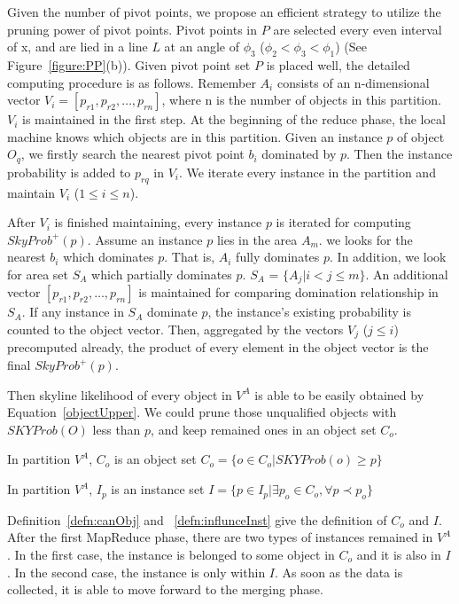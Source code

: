 Given the number of pivot points, we propose an efficient strategy to utilize the pruning power of pivot points. Pivot points in $P$ are selected every even interval of x, and are lied in a line $L$ at an angle of $\phi_3$ ($ \phi_2 < \phi_3 < \phi_1 $) (See Figure~\ref{figure:PP}(b)).
Given pivot point set $P$ is placed well, the detailed computing procedure is as follows. Remember $A_i$ consists of an n-dimensional vector $V_i = [p_{r1},p_{r2},\dots,p_{rn}]$, where n is the number of objects in this partition. $V_i$ is maintained in the first step. At the beginning of the reduce phase, the local machine knows which objects are in this partition. Given an instance $p$ of object $O_q$, we firstly search the nearest pivot point $b_i$ dominated by $p$. Then the instance probability is added to $p_{rq}$ in $V_i$. We iterate every instance in the partition and maintain $V_i$ ($ 1 \leq i \leq n$). 

After $V_i$ is finished maintaining, every instance $p$ is iterated for computing $SkyProb^+(p)$. Assume an instance $p$ lies in the area $A_m$. we looks for the nearest $b_i$ which dominates $p$. That is, $A_i$ fully dominates $p$. In addition, we look for area set $S_A$ which partially dominates $p$. $S_A$ = $\{A_j| i < j \leq m \}$.
An additional vector $[p_{r1},p_{r2},\dots,p_{rn}]$ is maintained for comparing domination relationship in $S_A$. If any instance in $S_A$ dominate $p$, the instance's existing probability is counted to the object vector. Then, aggregated by the vectors $V_j$ ($j \leq i$) precomputed already, the product of every element in the object vector is the final $SkyProb^+(p)$.

Then skyline likelihood of every object in $V^A$ is able to be easily obtained by Equation~\ref{objectUpper}. We could prune those unqualified objects with $SKYProb(O)$ less than $p$, and keep remained ones in an object set $C_o$.

\begin{defn}
\label{defn:canObj}
In partition $V^A$, $C_o$ is an object set $C_o = \{ o \in C_o | SKYProb(o) \geq p\}$
\end{defn}

\begin{defn}
\label{defn:influnceInst}
In partition $V^A$, $I_p$ is an instance set $I = \{p \in I_p | \exists p_o \in C_o,  \forall p \prec p_o\}$
\end{defn}

Definition~\ref{defn:canObj} and ~\ref{defn:influnceInst} give the definition of $C_o$ and $I$. After the first MapReduce phase, there are two types of instances remained in $V^A$. In the first case, the instance is belonged to some object in $C_o$ and it is also in $I$. In the second case, the instance is only within $I$. As soon as the data is collected, it is able to move forward to the merging phase.
